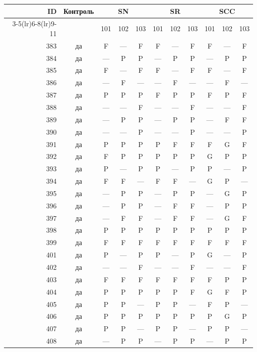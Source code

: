 \begin{table}[p]\centering\small
\begin{tabular*}{\textwidth}{@{\extracolsep{\fill}}rc*{9}{c}@{}}\toprule
ID & Контроль & \multicolumn{3}{c}{SN} & \multicolumn{3}{c}{SR} & \multicolumn{3}{c}{SCC}\\
\cmidrule(lr){3-5}\cmidrule(lr){6-8}\cmidrule(lr){9-11}
 & & 101 & 102 & 103 & 101 & 102 & 103 & 101 & 102 & 103\\\midrule
383 & да & F & — & F & F & — & F & F & — & F\\
384 & да & — & P & P & — & P & P & — & P & P\\
385 & да & F & — & F & F & — & F & F & — & F\\
386 & да & — & F & — & — & F & — & — & F & —\\
387 & да & P & P & P & F & P & P & F & P & F\\
388 & да & — & — & F & — & — & F & — & — & F\\
389 & да & — & P & P & — & P & P & — & F & F\\
390 & да & — & — & P & — & — & P & — & — & P\\
391 & да & P & P & P & P & F & F & F & G & F\\
392 & да & F & P & P & P & P & P & G & P & P\\
393 & да & P & — & P & P & — & P & P & — & P\\
394 & да & F & F & — & F & F & — & G & P & —\\
395 & да & — & P & P & — & P & P & — & G & P\\
396 & да & — & P & P & — & F & F & — & P & P\\
397 & да & — & F & F & — & F & F & — & G & F\\
398 & да & P & P & P & P & P & P & P & P & P\\
399 & да & F & F & F & F & F & F & F & F & F\\
401 & да & P & — & P & P & — & P & G & — & P\\
402 & да & — & — & F & — & — & F & — & — & F\\
403 & да & F & F & F & F & F & F & F & P & P\\
404 & да & P & P & P & P & P & F & G & F & P\\
405 & да & P & P & — & P & P & — & F & P & —\\
406 & да & P & P & P & P & P & P & P & G & P\\
407 & да & P & P & — & P & P & — & P & P & —\\
408 & да & — & P & P & — & P & P & — & P & P\\

\end{tabular*}
\end{table}
